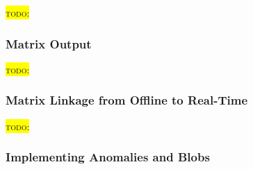 \documentclass[11pt,a4paper]{article}
\newcommand{\todo}[1]{\colorbox{yellow}{\textsc{todo}: #1}}
\begin{document}
\todo{}

\subsubsection{Matrix Output}

\todo{}

\subsubsection{Matrix Linkage from Offline to Real-Time}

\todo{}

\subsubsection{Implementing Anomalies and Blobs}

\end{document}
